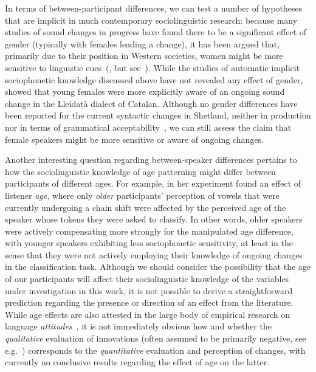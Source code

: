In terms of between-participant differences, we can test a number of hypotheses that are implicit in much contemporary sociolinguistic research: because many studies of sound changes in progress have found there to be a significant effect of gender (typically with females leading a change), it has been argued that, primarily due to their position in Western societies, women might be more sensitive to linguistic cues~(\citealt{Trudgill1972}, but see~\citealt{Eckert1989,Labov1990}). While the studies of automatic implicit sociophonetic knowledge discussed above have not revealed any effect of gender, \citet{Carrera-Sabate2014} showed that %
young females were more explicitly aware of an ongoing sound change in the Lleidatà dialect of Catalan. Although no gender differences have been reported for the current syntactic changes in Shetland, neither in production nor in terms of grammatical acceptability~\citep{Jamieson2015}, we can still assess the claim that female speakers might be more sensitive or aware of ongoing changes.

Another interesting question regarding between-speaker differences pertains to how the sociolinguistic knowledge of age patterning might differ between participants of different ages. For example, in her experiment \citet{Drager2011} found an effect of listener \emph{age}, where only \emph{older} participants' perception of vowels that were currently undergoing a chain shift were affected by the perceived age of the speaker whose tokens they were asked to classify. In other words, older speakers were actively compensating more strongly for the manipulated age difference, with younger speakers exhibiting less sociophonetic sensitivity, at least in the sense that they were not actively employing their knowledge of ongoing changes in the classification task. Although we should consider the possibility that the age of our participants will affect their sociolinguistic knowledge of the variables under investigation in this work, it is not possible to derive a straightforward prediction regarding the presence or direction of an effect from the literature. While age effects are also attested in the large body of empirical research on language \emph{attitudes}~\citep{Giles2004}, it is not immediately obvious how and whether the \emph{qualitative} evaluation of innovations (often assumed to be primarily negative, see e.g.~\citealt{Labov2001,Tagliamonte2012}) corresponds to the \emph{quantitative} evaluation and perception of changes, with currently no conclusive results regarding the effect of age on the latter. %

